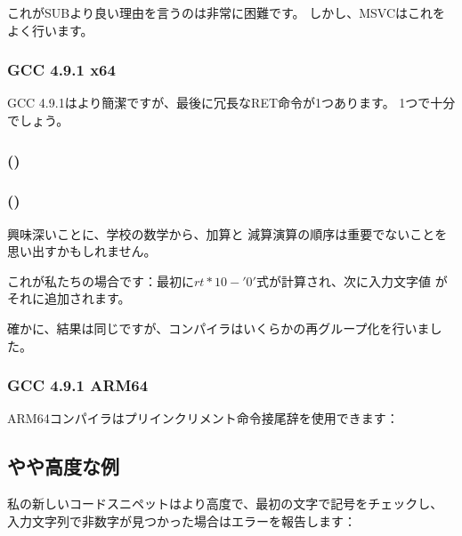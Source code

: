 これがSUBより良い理由を言うのは非常に困難です。
しかし、MSVCはこれをよく行います。

\subsubsection{\Optimizing GCC 4.9.1 x64}

\Optimizing GCC 4.9.1はより簡潔ですが、最後に冗長なRET命令が1つあります。
1つで十分でしょう。



\subsubsection{\OptimizingKeilVI (\ARMMode)}



\subsubsection{\OptimizingKeilVI (\ThumbMode)}



興味深いことに、学校の数学から、加算と
減算演算の順序は重要でないことを思い出すかもしれません。

これが私たちの場合です：最初に$rt*10 - '0'$式が計算され、次に入力文字値
がそれに追加されます。

確かに、結果は同じですが、コンパイラはいくらかの再グループ化を行いました。

\subsubsection{\Optimizing GCC 4.9.1 ARM64}

ARM64コンパイラはプリインクリメント命令接尾辞を使用できます：



\subsection{やや高度な例}

私の新しいコードスニペットはより高度で、最初の文字で記号をチェックし、
入力文字列で非数字が見つかった場合はエラーを報告します：

